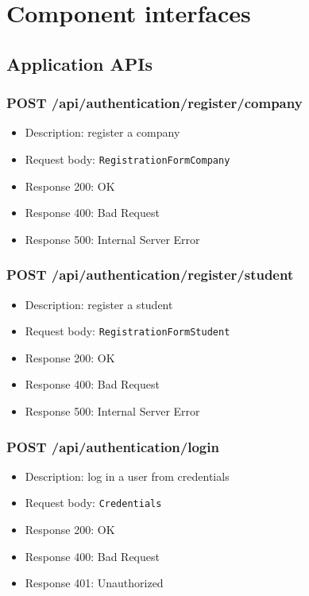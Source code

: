 \section{Component interfaces}

\subsection{Application APIs}

\subsubsection{POST /api/authentication/register/company}
\begin{itemize}
    \item Description: register a company
    \item Request body: \verb|RegistrationFormCompany|
    \item Response 200: OK
    \item Response 400: Bad Request
    \item Response 500: Internal Server Error
\end{itemize}

\subsubsection{POST /api/authentication/register/student}
\begin{itemize}
    \item Description: register a student
    \item Request body: \verb|RegistrationFormStudent|
    \item Response 200: OK
    \item Response 400: Bad Request
    \item Response 500: Internal Server Error
\end{itemize}

\subsubsection{POST /api/authentication/login}
\begin{itemize}
    \item Description: log in a user from credentials
    \item Request body: \verb|Credentials|
    \item Response 200: OK
    \item Response 400: Bad Request
    \item Response 401: Unauthorized
\end{itemize}


